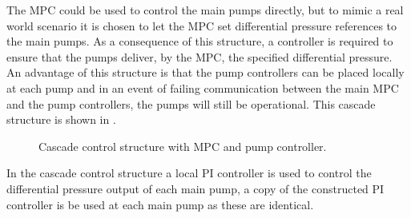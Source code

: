 The MPC could be used to control the main pumps directly, but to mimic a real world scenario it is chosen to let the MPC set differential pressure references to the main pumps. As a consequence of this structure, a controller is required to ensure that the pumps deliver, by the MPC, the specified differential pressure. An advantage of this structure is that the pump controllers can be placed locally at each pump and in an event of failing communication between the main MPC and the pump controllers, the pumps will still be operational. 
This cascade structure is shown in .  
\begin{figure}[H]
\centering
 
\caption{Cascade control structure with MPC and pump controller.}
\label{fig:control_structure}
\end{figure}


In the cascade control structure a local PI controller is used to control the differential pressure output of each main pump, a copy of the constructed PI controller is be used at each main pump as these are identical.


